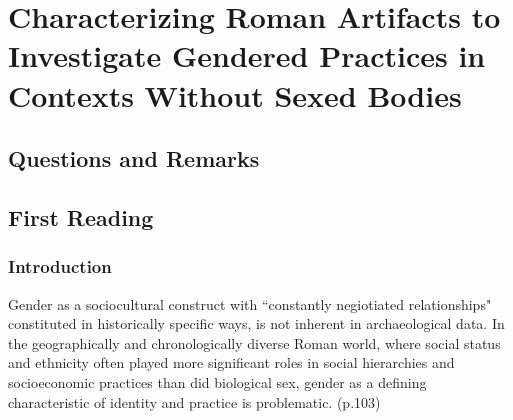 %
%
%
\chapter{Characterizing Roman Artifacts to Investigate Gendered Practices in Contexts Without Sexed Bodies}
\label{GendArt} %








\abstract{}

\section{Questions and Remarks}
\label{sec:QR14}





\section{First Reading}
\label{sec:FirRead14}



\subsection{Introduction}

Gender as a sociocultural construct with ``constantly negiotiated relationships" constituted in historically specific ways, is not inherent in archaeological data. In the geographically and chronologically diverse Roman world, where social status and ethnicity often played more significant roles in social hierarchies and socioeconomic practices than did biological sex, gender as a defining characteristic of identity and practice is problematic. (p.103)


